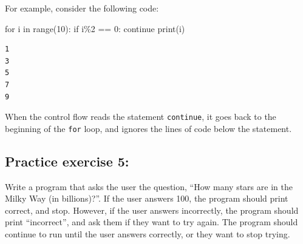 \documentclass[
  letterpaper,
  DIV=11,
  numbers=noendperiod]{scrreprt}
\newenvironment{Shaded}{\begin{snugshade}}{\end{snugshade}}
\newcommand{\BuiltInTok}[1]{\textcolor[rgb]{0.00,0.23,0.31}{#1}}
\newcommand{\ControlFlowTok}[1]{\textcolor[rgb]{0.00,0.23,0.31}{#1}}
\newcommand{\DecValTok}[1]{\textcolor[rgb]{0.68,0.00,0.00}{#1}}
\newcommand{\KeywordTok}[1]{\textcolor[rgb]{0.00,0.23,0.31}{#1}}
\newcommand{\NormalTok}[1]{\textcolor[rgb]{0.00,0.23,0.31}{#1}}
\newcommand{\OperatorTok}[1]{\textcolor[rgb]{0.37,0.37,0.37}{#1}}
\begin{document}
For example, consider the following code:

\begin{Shaded}
\begin{Highlighting}[]
\ControlFlowTok{for}\NormalTok{ i }\KeywordTok{in} \BuiltInTok{range}\NormalTok{(}\DecValTok{10}\NormalTok{):}
    \ControlFlowTok{if}\NormalTok{ i}\OperatorTok{\%}\DecValTok{2} \OperatorTok{==} \DecValTok{0}\NormalTok{:}
        \ControlFlowTok{continue}
    \BuiltInTok{print}\NormalTok{(i)}
\end{Highlighting}
\end{Shaded}

\begin{verbatim}
1
3
5
7
9
\end{verbatim}

When the control flow reads the statement \texttt{continue}, it goes
back to the beginning of the \texttt{for} loop, and ignores the lines of
code below the statement.

\hypertarget{practice-exercise-5-1}{%
\subsection{Practice exercise 5:}\label{practice-exercise-5-1}}

Write a program that asks the user the question, ``How many stars are in
the Milky Way (in billions)?''. If the user answers 100, the program
should print correct, and stop. However, if the user answers
incorrectly, the program should print ``incorrect'', and ask them if
they want to try again. The program should continue to run until the
user answers correctly, or they want to stop trying.
\end{document}

